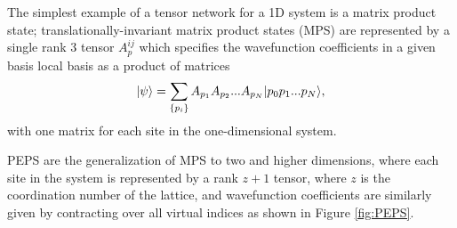 The simplest example of a tensor network for a 1D system is a matrix
product state; translationally-invariant matrix product states (MPS)
are represented by a single rank 3 tensor $A_p^{ij}$ which specifies
the wavefunction coefficients in a given basis local basis as a
product of matrices $$\vert \psi \rangle = \sum\limits_{\{p_i\}} A_{p_1}
A_{p_2} ... A_{p_N} \vert p_0 p_1 ... p_N \rangle,$$ with one matrix for each
site in the one-dimensional system.

PEPS are the generalization of MPS to two and higher dimensions, where
each site in the system is represented by a rank $z+1$ tensor, where
$z$ is the coordination number of the lattice, and wavefunction
coefficients are similarly given by contracting over all virtual
indices as shown in Figure \ref{fig:PEPS}.\cite{verstraete2004} 